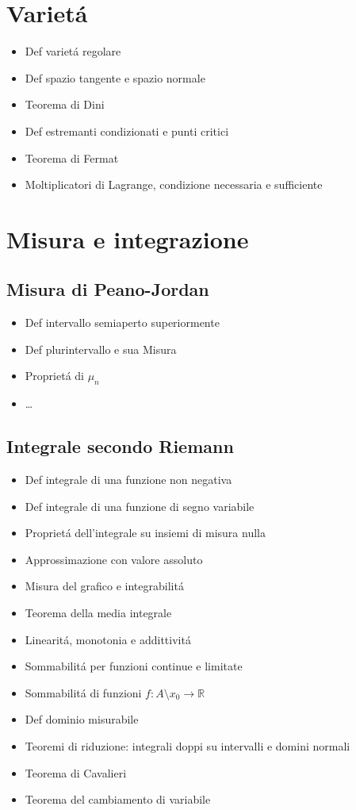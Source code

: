\documentclass[10pt,a4paper, twocolumn]{article}
\newcommand{\R}{\mathbb{R}}
\renewcommand{\,}{\text{, }}
\begin{document}
\section{Variet\'a}
\begin{itemize}
    \item Def variet\'a regolare
    \item Def spazio tangente e spazio normale
    \item Teorema di Dini
    \item Def estremanti condizionati e punti critici
    \item Teorema di Fermat
    \item Moltiplicatori di Lagrange, condizione necessaria e sufficiente
\end{itemize}

\section{Misura e integrazione}
\subsection{Misura di Peano-Jordan}
\begin{itemize}
    \item Def intervallo semiaperto superiormente
    \item Def plurintervallo e sua Misura
    \item Propriet\'a di $\mu_n$
    \item \dots
\end{itemize}

\subsection{Integrale secondo Riemann}
\begin{itemize}
    \item Def integrale di una funzione non negativa
    \item Def integrale di una funzione di segno variabile
    \item Propriet\'a dell'integrale su insiemi di misura nulla
    \item Approssimazione con valore assoluto
    \item Misura del grafico e integrabilit\'a
    \item Teorema della media integrale
    \item Linearit\'a, monotonia e addittivit\'a
    \item Sommabilit\'a per funzioni continue e limitate
    \item Sommabilit\'a di funzioni $f:A\setminus{x_0} \rightarrow \R$
    \item Def dominio misurabile
    \item Teoremi di riduzione: integrali doppi su intervalli e domini normali
    \item Teorema di Cavalieri
    \item Teorema del cambiamento di variabile
\end{itemize}
\end{document}
